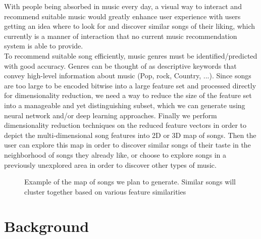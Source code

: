 \documentclass[10pt,twocolumn,letterpaper]{article}
\begin{document}
With people being absorbed in music every day, a visual way to interact and recommend suitable music would greatly enhance user experience with users getting an idea where to look for and discover similar songs of their liking, which currently is a manner of interaction that no current music recommendation system is able to provide.\\ 

To recommend suitable song efficiently, music genres must be identified/predicted with good accuracy. Genres can be thought of as descriptive keywords that convey high-level information about music (Pop, rock, Country, ...). Since songs are too large to be encoded bitwise into a large feature set and processed directly for dimensionality reduction, we need a way to reduce the size of the feature set into a manageable and yet distinguishing subset, which we can generate using neural network and/or deep learning approaches. Finally we perform dimensionality reduction techniques on the reduced feature vectors in order to depict the multi-dimensional song features into 2D or 3D map of songs. Then the user can explore this map in order to discover similar songs of their taste in the neighborhood of songs they already like, or choose to explore songs in a previously unexplored area in order to discover other types of music.

 \begin{figure}
 	\begin{center}
 	\end{center}
 	\caption{Example of the map of songs we plan to generate. Similar songs will cluster together based on various feature similarities}
 \end{figure}

\section {Background}
\end{document}

